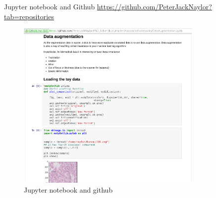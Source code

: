 \documentclass{beamer}
\begin{document}
\begin{frame}{Jupyter notebook and Github}
\url{https://github.com/PeterJackNaylor?tab=repositories}
\begin{figure}
\includegraphics[width=0.8\textwidth]{GitBook.png}
\caption{Jupyter notebook and github}
\end{figure}
\end{frame}
\end{document}
